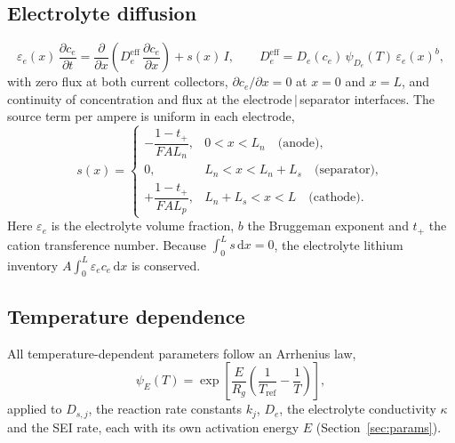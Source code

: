 \documentclass[11pt]{article}
\newcommand{\ce}{c_{e}}
\newcommand{\eps}{\varepsilon}
\newcommand{\dd}{\mathrm{d}}
\newcommand{\pd}[2]{\frac{\partial #1}{\partial #2}}
\newcommand{\Tref}{T_{\mathrm{ref}}}
\begin{document}
\subsection{Electrolyte diffusion}
\begin{equation}
\eps_e(x)\,\pd{\ce}{t}=\pd{}{x}\!\left(D_e^{\mathrm{eff}}\,\pd{\ce}{x}\right)+s(x)\,I,
\qquad D_e^{\mathrm{eff}}=D_e(\ce)\,\psi_{D_e}(T)\,\eps_e(x)^{b}, \label{eq:elyte}
\end{equation}
with zero flux at both current collectors, $\partial\ce/\partial x=0$ at $x=0$ and $x=L$, and continuity of concentration and flux at the electrode\,$|$\,separator interfaces. The source term per ampere is uniform in each electrode,
\begin{equation}
s(x)=\begin{cases}
-\dfrac{1-t_+}{F A L_n}, & 0<x<L_n \quad\text{(anode)},\\[2mm]
0, & L_n<x<L_n+L_s \quad\text{(separator)},\\[1mm]
+\dfrac{1-t_+}{F A L_p}, & L_n+L_s<x<L \quad\text{(cathode)}.
\end{cases}\label{eq:source}
\end{equation}
Here $\eps_e$ is the electrolyte volume fraction, $b$ the Bruggeman exponent and $t_+$ the cation transference number. Because $\int_0^L s\,\dd x=0$, the electrolyte lithium inventory $A\int_0^L \eps_e\ce\,\dd x$ is conserved.

\subsection{Temperature dependence}
All temperature-dependent parameters follow an Arrhenius law,
\begin{equation}
\psi_{E}(T)=\exp\!\left[\frac{E}{R_g}\left(\frac{1}{\Tref}-\frac{1}{T}\right)\right],\label{eq:arr}
\end{equation}
applied to $D_{s,j}$, the reaction rate constants $k_j$, $D_e$, the electrolyte conductivity $\kappa$ and the SEI rate, each with its own activation energy $E$ (Section~\ref{sec:params}).
\end{document}
